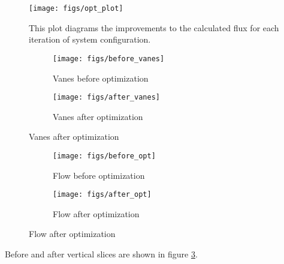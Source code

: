 \begin{figure}[htb]
 \centering
 \texttt{[image: figs/opt\_plot]}
 \caption{This plot diagrams the improvements to the calculated flux for  
 each iteration of system configuration.}
 \label{fig:opt_plot}
\end{figure}


\begin{figure}[htb!]
 \begin{subfigure}{.5\textwidth}
  \centering
  \texttt{[image: figs/before\_vanes]}
  \caption{Vanes before optimization}
 \end{subfigure}%
 \begin{subfigure}{.5\textwidth}
  \centering
  \texttt{[image: figs/after\_vanes]}
  \caption{Vanes after optimization}
 \end{subfigure}%
 \label{fig:vt-wind-vert}
\end{figure}


%
%
\begin{figure}[htb!]
 \begin{subfigure}{.5\textwidth}
  \centering
  \texttt{[image: figs/before\_opt]}
  \caption{Flow before optimization}
 \end{subfigure}%
 \begin{subfigure}{.5\textwidth}
  \centering
  \texttt{[image: figs/after\_opt]}
  \caption{Flow after optimization}
 \end{subfigure}%
  \label{fig:opt_flow}
\end{figure}
%
Before and after vertical slices are shown in figure \ref{fig:opt_flow}.
